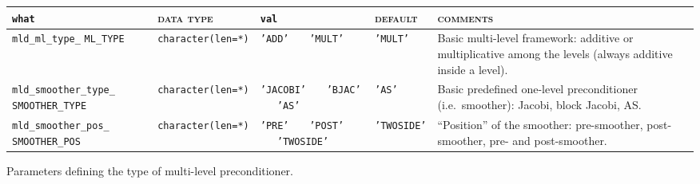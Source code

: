 \bsideways
\begin{center}
\begin{tabular}{|p{5cm}|l|p{2cm}|l|p{7cm}|}
\hline
\verb|what|              & \textsc{data type}        &  \verb|val|      &  \textsc{default}  &
\textsc{comments} \\ \hline
\verb|mld_ml_type_| \break \verb|ML_TYPE|     & \verb|character(len=*)|
                         & \texttt{'ADD'} \ \ \ \texttt{'MULT'}   
                         & \texttt{'MULT'}
                         & Basic multi-level framework: additive or multiplicative
                           among the levels (always additive inside a level).         \\ \hline 
\verb|mld_smoother_type_| \break \verb|SMOOTHER_TYPE|  & \verb|character(len=*)|
                         & \texttt{'JACOBI'} \ \ \ \texttt{'BJAC'} \ \ \ \texttt{'AS'}
                         & \texttt{'AS'}
                         & Basic predefined one-level preconditioner
                         (i.e.\ smoother): Jacobi, block Jacobi, AS. \\ \hline
\verb|mld_smoother_pos_| \break \verb|SMOOTHER_POS| & \verb|character(len=*)|
                         & \texttt{'PRE'} \ \ \ \texttt{'POST'} \ \ \ \texttt{'TWOSIDE'}
                         & \texttt{'TWOSIDE'}
                         & ``Position'' of the smoother: pre-smoother, post-smoother, 
                           pre- and post-smoother. \\
\hline
\end{tabular}
\end{center}
\caption{Parameters defining the type of multi-level preconditioner.
\label{tab:p_type}}                       
\esideways
                   
